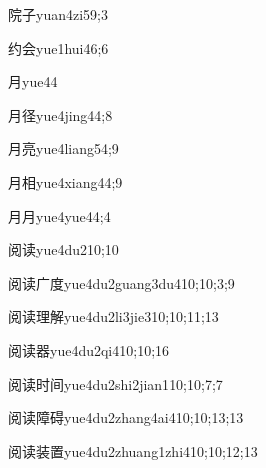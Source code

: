 \begin{verbete}{院子}{yuan4zi5}{9;3}
\end{verbete}
\begin{verbete}{约会}{yue1hui4}{6;6}
\end{verbete}
\begin{verbete}{月}{yue4}{4}
\end{verbete}
\begin{verbete}{月径}{yue4jing4}{4;8}
\end{verbete}
\begin{verbete}{月亮}{yue4liang5}{4;9}
\end{verbete}
\begin{verbete}{月相}{yue4xiang4}{4;9}
\end{verbete}
\begin{verbete}{月月}{yue4yue4}{4;4}
\end{verbete}
\begin{verbete}{阅读}{yue4du2}{10;10}
\end{verbete}
\begin{verbete}{阅读广度}{yue4du2guang3du4}{10;10;3;9}
\end{verbete}
\begin{verbete}{阅读理解}{yue4du2li3jie3}{10;10;11;13}
\end{verbete}
\begin{verbete}{阅读器}{yue4du2qi4}{10;10;16}
\end{verbete}
\begin{verbete}{阅读时间}{yue4du2shi2jian1}{10;10;7;7}
\end{verbete}
\begin{verbete}{阅读障碍}{yue4du2zhang4ai4}{10;10;13;13}
\end{verbete}
\begin{verbete}{阅读装置}{yue4du2zhuang1zhi4}{10;10;12;13}
\end{verbete}
